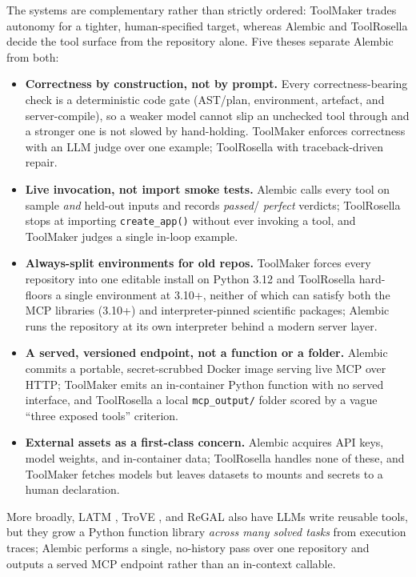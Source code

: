 The systems are complementary rather than strictly ordered: ToolMaker trades
autonomy for a tighter, human-specified target, whereas Alembic and ToolRosella
decide the tool surface from the repository alone. Five theses separate Alembic
from both:

\begin{itemize}
  \setlength{\itemsep}{2pt}\setlength{\parskip}{0pt}\setlength{\topsep}{3pt}
  \item \textbf{Correctness by construction, not by prompt.} Every
  correctness-bearing check is a deterministic code gate (AST/plan,
  environment, artefact, and server-compile), so a weaker model cannot slip an
  unchecked tool through and a stronger one is not slowed by hand-holding.
  ToolMaker enforces correctness with an LLM judge over one example; ToolRosella
  with traceback-driven repair.
  \item \textbf{Live invocation, not import smoke tests.} Alembic calls every
  tool on sample \emph{and} held-out inputs and records \emph{passed}/%
  \emph{perfect} verdicts; ToolRosella stops at importing \texttt{create\_app()}
  without ever invoking a tool, and ToolMaker judges a single in-loop example.
  \item \textbf{Always-split environments for old repos.} ToolMaker forces every
  repository into one editable install on Python 3.12 and ToolRosella hard-floors
  a single environment at 3.10+, neither of which can satisfy both the MCP
  libraries (3.10+) and interpreter-pinned scientific packages; Alembic runs the
  repository at its own interpreter behind a modern server layer.
  \item \textbf{A served, versioned endpoint, not a function or a folder.}
  Alembic commits a portable, secret-scrubbed Docker image serving live MCP over
  HTTP; ToolMaker emits an in-container Python function with no served interface,
  and ToolRosella a local \texttt{mcp\_output/} folder scored by a vague ``three
  exposed tools'' criterion.
  \item \textbf{External assets as a first-class concern.} Alembic acquires API
  keys, model weights, and in-container data; ToolRosella handles none of these,
  and ToolMaker fetches models but leaves datasets to mounts and secrets to a
  human declaration.
\end{itemize}

More broadly, LATM \citep{latm2024}, TroVE \citep{trove2024}, and ReGAL \citep{regal2024} also have LLMs write reusable tools, but they grow a Python function library \emph{across many solved tasks} from execution traces; Alembic performs a single, no-history pass over one repository and outputs a served MCP endpoint rather than an in-context callable.
